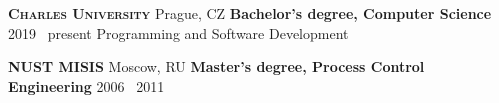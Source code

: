 
\vspace{1.0em}

\textsc{\textbf{Charles University}} \textsuperscript{\href{https://www.cuni.cz/}{\faExternalLink*}}
\hfill Prague, CZ \newline
\textbf{Bachelor's degree, Computer Science}
\hfill 2019 \textendash\ present \newline
Programming and Software Development

\vspace{1.0em}

\textsc{\textbf{NUST MISIS}} \textsuperscript{\href{https://www.misis.ru/}{\faExternalLink*}}
\hfill Moscow, RU \newline
\textbf{Master's degree, Process Control Engineering}
\hfill 2006 \textendash\ 2011

\vspace{1.0em}
